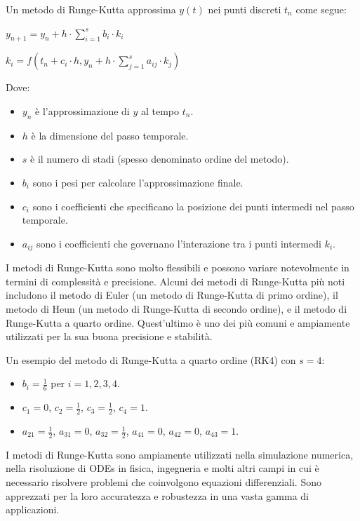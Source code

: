Un metodo di Runge-Kutta approssima \(y(t)\) nei punti discreti \(t_n\) come segue:

\(y_{n+1} = y_n + h \cdot \sum_{i=1}^{s} b_i \cdot k_i\)

\(k_i = f(t_n + c_i \cdot h, y_n + h \cdot \sum_{j=1}^{s} a_{ij} \cdot k_j)\)

Dove:
\begin{itemize}
    \item \(y_n\) è l'approssimazione di \(y\) al tempo \(t_n\).
    \item \(h\) è la dimensione del passo temporale.
    \item \(s\) è il numero di stadi (spesso denominato ordine del metodo).
    \item \(b_i\) sono i pesi per calcolare l'approssimazione finale.
    \item \(c_i\) sono i coefficienti che specificano la posizione dei punti intermedi nel passo temporale.
    \item \(a_{ij}\) sono i coefficienti che governano l'interazione tra i punti intermedi \(k_i\).
\end{itemize}

I metodi di Runge-Kutta sono molto flessibili e possono variare notevolmente in termini di complessità e precisione. Alcuni dei metodi di Runge-Kutta più noti includono il metodo di Euler (un metodo di Runge-Kutta di primo ordine), il metodo di Heun (un metodo di Runge-Kutta di secondo ordine), e il metodo di Runge-Kutta a quarto ordine. Quest'ultimo è uno dei più comuni e ampiamente utilizzati per la sua buona precisione e stabilità.

Un esempio del metodo di Runge-Kutta a quarto ordine (RK4) con \(s = 4\):

\begin{itemize}
    \item \(b_i = \frac{1}{6}\) per \(i = 1, 2, 3, 4\).
    \item \(c_1 = 0\), \(c_2 = \frac{1}{2}\), \(c_3 = \frac{1}{2}\), \(c_4 = 1\).
    \item \(a_{21} = \frac{1}{2}\), \(a_{31} = 0\), \(a_{32} = \frac{1}{2}\), \(a_{41} = 0\), \(a_{42} = 0\), \(a_{43} = 1\).
\end{itemize}

I metodi di Runge-Kutta sono ampiamente utilizzati nella simulazione numerica, nella risoluzione di ODEs in fisica, ingegneria e molti altri campi in cui è necessario risolvere problemi che coinvolgono equazioni differenziali. Sono apprezzati per la loro accuratezza e robustezza in una vasta gamma di applicazioni.

